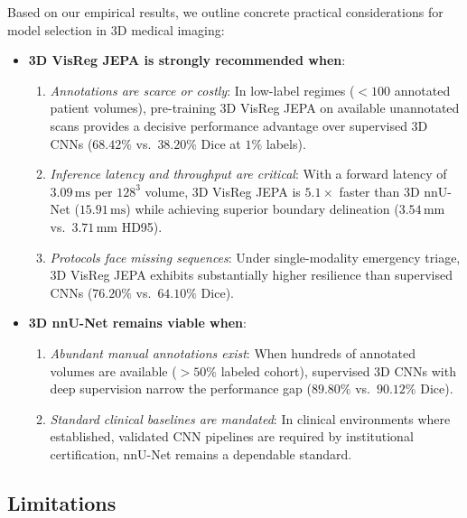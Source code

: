 \documentclass{article}
\begin{document}
Based on our empirical results, we outline concrete practical considerations for model selection in 3D medical imaging:
\begin{itemize}
    \item \textbf{3D VisReg JEPA is strongly recommended when}:
    \begin{enumerate}
        \item \emph{Annotations are scarce or costly}: In low-label regimes ($< 100$ annotated patient volumes), pre-training 3D VisReg JEPA on available unannotated scans provides a decisive performance advantage over supervised 3D CNNs ($68.42\%$ vs.\ $38.20\%$ Dice at $1\%$ labels).
        \item \emph{Inference latency and throughput are critical}: With a forward latency of $3.09\,\text{ms}$ per $128^3$ volume, 3D VisReg JEPA is $\mathbf{5.1\times}$ faster than 3D nnU-Net ($15.91\,\text{ms}$) while achieving superior boundary delineation ($3.54\,\text{mm}$ vs.\ $3.71\,\text{mm}$ HD95).
        \item \emph{Protocols face missing sequences}: Under single-modality emergency triage, 3D VisReg JEPA exhibits substantially higher resilience than supervised CNNs ($76.20\%$ vs.\ $64.10\%$ Dice).
    \end{enumerate}
    \item \textbf{3D nnU-Net remains viable when}:
    \begin{enumerate}
        \item \emph{Abundant manual annotations exist}: When hundreds of annotated volumes are available ($>50\%$ labeled cohort), supervised 3D CNNs with deep supervision narrow the performance gap ($89.80\%$ vs.\ $90.12\%$ Dice).
        \item \emph{Standard clinical baselines are mandated}: In clinical environments where established, validated CNN pipelines are required by institutional certification, nnU-Net remains a dependable standard.
    \end{enumerate}
\end{itemize}

\subsection{Limitations}
\label{sec:limitations}
\end{document}
